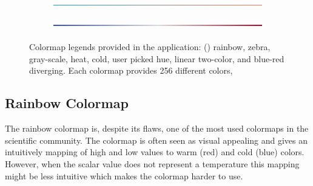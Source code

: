 \begin{figure}
\begin{subfigure}{1\textwidth}
\begin{minipage}[l]{0.95\textwidth}
  		\end{minipage}
  	\end{subfigure}
  	\begin{subfigure}{1\textwidth}
  		\begin{minipage}[l]{0.05\textwidth}
    		\caption{} \label{fig:colormaps:legends::twocolors}
  		\end{minipage}
  	\hfill
  		\begin{minipage}[l]{0.95\textwidth}
    		\includegraphics[width=\textwidth,height=15px,keepaspectratio=false,frame]{colormapping/img/colormap_legends/twocolorscolormap.png}
  		\end{minipage}
  	\end{subfigure}
  	\begin{subfigure}{1\textwidth}
  		\begin{minipage}[l]{0.05\textwidth}
    		\caption{} \label{fig:colormaps:legends::diverging}
  		\end{minipage}
  	\hfill
  		\begin{minipage}[l]{0.95\textwidth}
    		\includegraphics[width=\textwidth,height=15px,keepaspectratio=false,frame]{colormapping/img/colormap_legends/divergingcolormap.png}
  		\end{minipage}
  	\end{subfigure}
\caption{Colormap legends provided in the application: 
() rainbow, 
 zebra,
 gray-scale,
 heat,
 cold,
 user picked hue,
 linear two-color, and
 blue-red diverging. Each colormap provides 256 different colors, 
 }\label{fig:colormaps:legends}
\end{figure}


\subsection{Rainbow Colormap} %
\label{ssub:rainbow_colormap}
The rainbow colormap is, despite its flaws, one of the most used colormaps in the scientific community. The colormap is often seen as visual appealing and gives an intuitively mapping of high and low values to warm (red) and cold (blue) colors. However, when the scalar value does not represent a temperature this mapping might be less intuitive which makes the colormap harder to use.

